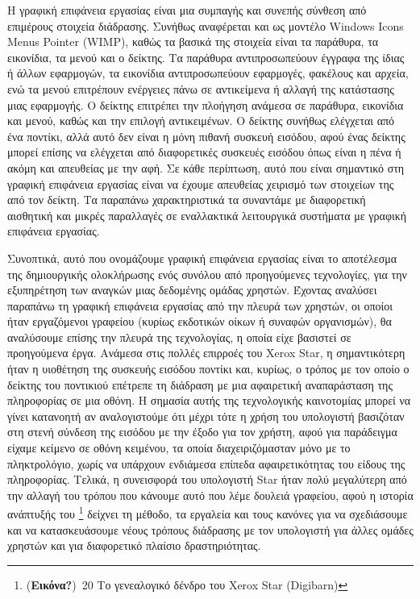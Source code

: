 \documentclass[
]{article}
\begin{document}
Η γραφική επιφάνεια εργασίας είναι μια συμπαγής και συνεπής σύνθεση από
επιμέρους στοιχεία διάδρασης. Συνήθως αναφέρεται και ως μοντέλο Windows
Icons Menus Pointer (WIMP), καθώς τα βασικά της στοιχεία είναι τα
παράθυρα, τα εικονίδια, τα μενού και ο δείκτης. Τα παράθυρα
αντιπροσωπεύουν έγγραφα της ίδιας ή άλλων εφαρμογών, τα εικονίδια
αντιπροσωπεύουν εφαρμογές, φακέλους και αρχεία, ενώ τα μενού επιτρέπουν
ενέργειες πάνω σε αντικείμενα ή αλλαγή της κατάστασης μιας εφαρμογής. Ο
δείκτης επιτρέπει την πλοήγηση ανάμεσα σε παράθυρα, εικονίδια και μενού,
καθώς και την επιλογή αντικειμένων. Ο δείκτης συνήθως ελέγχεται από ένα
ποντίκι, αλλά αυτό δεν είναι η μόνη πιθανή συσκευή εισόδου, αφού ένας
δείκτης μπορεί επίσης να ελέγχεται από διαφορετικές συσκευές εισόδου
όπως είναι η πένα ή ακόμη και απευθείας με την αφή. Σε κάθε περίπτωση,
αυτό που είναι σημαντικό στη γραφική επιφάνεια εργασίας είναι να έχουμε
απευθείας χειρισμό των στοιχείων της από τον δείκτη. Τα παραπάνω
χαρακτηριστικά τα συναντάμε με διαφορετική αισθητική και μικρές
παραλλαγές σε εναλλακτικά λειτουργικά συστήματα με γραφική επιφάνεια
εργασίας.

Συνοπτικά, αυτό που ονομάζουμε γραφική επιφάνεια εργασίας είναι το
αποτέλεσμα της δημιουργικής ολοκλήρωσης ενός συνόλου από προηγούμενες
τεχνολογίες, για την εξυπηρέτηση των αναγκών μιας δεδομένης ομάδας
χρηστών. Έχοντας αναλύσει παραπάνω τη γραφική επιφάνεια εργασίας από την
πλευρά των χρηστών, οι οποίοι ήταν εργαζόμενοι γραφείου (κυρίως
εκδοτικών οίκων ή συναφών οργανισμών), θα αναλύσουμε επίσης την πλευρά
της τεχνολογίας, η οποία είχε βασιστεί σε προηγούμενα έργα. Ανάμεσα στις
πολλές επιρροές του Xerox Star, η σημαντικότερη ήταν η υιοθέτηση της
συσκευής εισόδου ποντίκι και, κυρίως, ο τρόπος με τον οποίο ο δείκτης
του ποντικιού επέτρεπε τη διάδραση με μια αφαιρετική αναπαράσταση της
πληροφορίας σε μια οθόνη. Η σημασία αυτής της τεχνολογικής καινοτομίας
μπορεί να γίνει κατανοητή αν αναλογιστούμε ότι μέχρι τότε η χρήση του
υπολογιστή βασιζόταν στη στενή σύνδεση της εισόδου με την έξοδο για τον
χρήστη, αφού για παράδειγμα είχαμε κείμενο σε οθόνη κειμένου, τα οποία
διαχειριζόμασταν μόνο με το πληκτρολόγιο, χωρίς να υπάρχουν ενδιάμεσα
επίπεδα αφαιρετικότητας του είδους της πληροφορίας. Τελικά, η συνεισφορά
του υπολογιστή Star ήταν πολύ μεγαλύτερη από την αλλαγή του τρόπου που
κάνουμε αυτό που λέμε δουλειά γραφείου, αφού η ιστορία ανάπτυξής του
\footnote{(\textbf{Εικόνα?})~20 Το γενεαλογικό δένδρο του Xerox Star
  (Digibarn)} δείχνει τη μέθοδο, τα εργαλεία και τους κανόνες για να
σχεδιάσουμε και να κατασκευάσουμε νέους τρόπους διάδρασης με τον
υπολογιστή για άλλες ομάδες χρηστών και για διαφορετικό πλαίσιο
δραστηριότητας.
\end{document}
